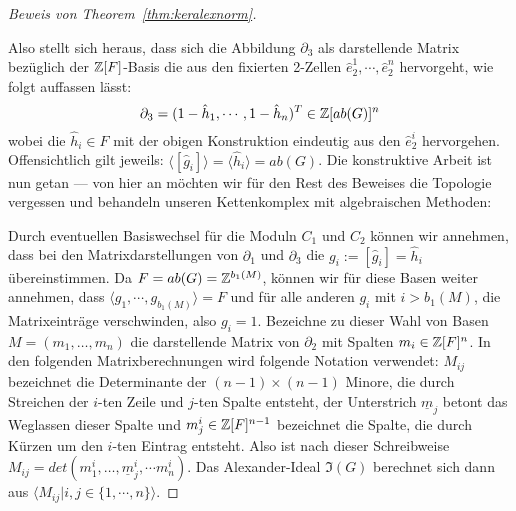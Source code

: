 \begin{proof}[Beweis von Theorem~\ref{thm:keralexnorm}]
\begin{center}

\end{center}


	Also stellt sich heraus, dass sich die Abbildung $\partial_3$ als darstellende Matrix bezüglich der $\mathbb{Z}[F]$-Basis die aus den fixierten 2-Zellen $\hat e_2^1,\cdots, \hat e_2^n$ hervorgeht, wie folgt auffassen lässt:
	\[
		\partial_3 = (1-\hat h_1,\cdots, 1-\hat h_n)^T \in \mathbb{Z}[ab(G)]^n
	\]
	wobei die $\hat h_i \in F$ mit der obigen Konstruktion eindeutig aus den $\hat e_2^i$ hervorgehen. Offensichtlich gilt jeweils: $\langle [\hat g_i] \rangle = \langle \hat h_i \rangle = ab(G)$. Die konstruktive Arbeit ist nun getan --- von hier an möchten wir für den Rest des Beweises die Topologie vergessen und behandeln unseren Kettenkomplex mit algebraischen Methoden:

	Durch eventuellen Basiswechsel für die Moduln $C_1$ und $C_2$ können wir annehmen, dass bei den Matrixdarstellungen von $\partial_1$ und $\partial_3$ die $g_i:=[\hat g_i]= \hat h_i$ übereinstimmen. Da $F=ab(G)=\mathbb{Z}^{b_1(M)}$, können wir für diese Basen weiter annehmen, dass $\langle g_1,\cdots,g_{b_1(M)}\rangle=F$ und für alle anderen $g_i$ mit $i> b_1(M)$, die Matrixeinträge verschwinden, also $g_i=1$. Bezeichne zu dieser Wahl von Basen $M= (m_1,\dots,m_n)$ die darstellende Matrix von $\partial_2$ mit Spalten $m_i\in \mathbb{Z}[F]^n$. In den folgenden Matrixberechnungen wird folgende Notation verwendet: $M_{ij}$ bezeichnet die Determinante der $(n-1)\times (n-1)$ Minore, die durch Streichen der $i$-ten Zeile und $j$-ten Spalte entsteht, der Unterstrich $\underline m_j$ betont das Weglassen dieser Spalte und $m_j^i\in \mathbb{Z}[F]^{n-1}$ bezeichnet die Spalte, die durch Kürzen um den $i$-ten Eintrag entsteht. Also ist nach dieser Schreibweise $M_{ij}=det(m^i_1, \dots , \underline m^i_j , \cdots m^i_n)$. Das Alexander-Ideal $\mathfrak I(G)$ berechnet sich dann aus $\langle M_{ij}| i,j \in \{1,\cdots,n\} \rangle$.


\end{proof}
